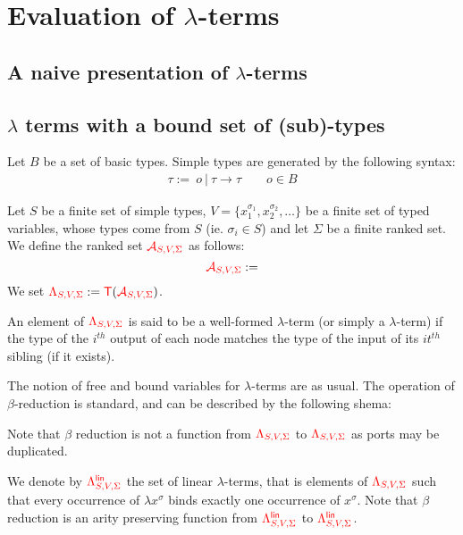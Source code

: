 \section{Evaluation of $\lambda$-terms}
\label{sec:eval}

\subsection{A naive presentation of $\lambda$-terms}

\subsection{$\lambda$ terms with a bound set of (sub)-types}

\begin{definition}
Let $B$ be a set of basic types. Simple types are generated by the following syntax: 
\begin{align*}
\tau:= \ o\ |\  \tau\rightarrow \tau \qquad o\in B
\end{align*}
\end{definition}

\begin{definition}
Let $S$ be a finite set of simple types, $V=\{x_1^{\sigma_1},x_2^{\sigma_2},\dots\}$ be a finite set of typed variables, whose types come from $S$ (ie. $\sigma_i \in S$) and let  $\Sigma$ be a finite ranked set. 
We define the ranked set ${\color{red}{\mathcal{A}_{S,V,\Sigma}}}$ as follows:
 $${\color{red}{\mathcal{A}_{S,V,\Sigma}}}:=$$
We set ${\color{red}{\Lambda_{S,V,\Sigma}}}:={\color{red}{\mathsf T}}({\color{red}{\mathcal{A}_{S,V,\Sigma}}})$. 
\end{definition}
 \newcommand{\rlambda}{\ranked{\Lambda}}
 \newcommand{\rlambdalin}{\ranked{\Lambda^{\sf{lin}}}}
 \newcommand{\rlambdathin}{\ranked{\Lambda^{\sf{thin}}}}

An element of ${\color{red}{\Lambda_{S,V,\Sigma}}}$ is said to be a well-formed $\lambda$-term (or simply a $\lambda$-term) if the type of the $i^{th}$ output of each node matches the type of the input of its $it^{th}$ sibling (if it exists).

The notion of free and bound variables for $\lambda$-terms are as usual. The operation of $\beta$-reduction is standard, and can be described by the following shema:

Note that $\beta$ reduction is not a function from ${\color{red}{\Lambda_{S,V,\Sigma}}}$ to ${\color{red}{\Lambda_{S,V,\Sigma}}}$ as ports may be duplicated. 

We denote by ${\color{red}{\Lambda^{\sf{lin}}_{S,V,\Sigma}}}$ the set of linear $\lambda$-terms, that is elements of ${\color{red}{\Lambda_{S,V,\Sigma}}}$ such that every occurrence of $\lambda x^\sigma$ binds exactly one occurrence of $x^\sigma$. Note that $\beta$ reduction is an arity preserving function from ${\color{red}{\Lambda^{\sf{lin}}_{S,V,\Sigma}}}$ to ${\color{red}{\Lambda^{\sf{lin}}_{S,V,\Sigma}}}$.  

